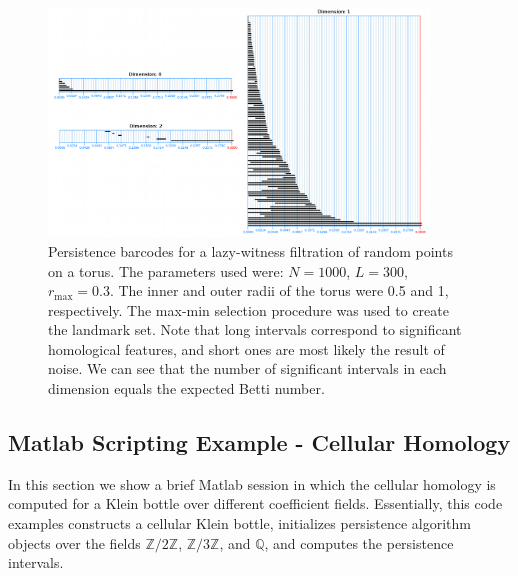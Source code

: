 \begin{figure}
\centering
\includegraphics[width=0.9\textwidth]{Adams_Henry/images/barcodes_small.png}
\caption{Persistence barcodes for a lazy-witness filtration of random points on a torus. The parameters used were: $N = 1000$, $L = 300$, $r_{\max} = 0.3$. The inner and outer radii of the torus were 0.5 and 1, respectively. The max-min selection procedure was used to create the landmark set. Note that long intervals correspond to significant homological features, and short ones are most likely the result of noise. We can see that the number of significant intervals in each dimension equals the expected Betti number.} \label{lwtorusbarcodes}
\end{figure}

\subsection{Matlab Scripting Example - Cellular Homology}

In this section we show a brief Matlab session in which the cellular homology is computed for a Klein bottle over different coefficient fields. Essentially, this code examples constructs a cellular Klein bottle, initializes persistence algorithm objects over the fields $\mathbb{Z}/2\mathbb{Z}$, $\mathbb{Z}/3\mathbb{Z}$, and $\mathbb{Q}$, and computes the persistence intervals.


